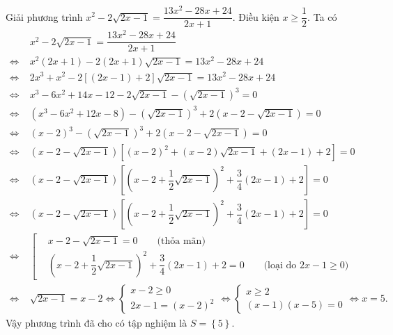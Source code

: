\begin{ex}%
Giải phương trình $x^2-2\sqrt{2x-1}=\dfrac{13x^2-28x+24}{2x+1}$.
\loigiai
    {
Điều kiện $x\ge \dfrac{1}{2}$. Ta có
{\allowdisplaybreaks \begin{align*}
&x^2-2\sqrt{2x-1}=\dfrac{13x^2-28x+24}{2x+1}\\ 
\Leftrightarrow\;&x^2(2x+1)-2(2x+1)\sqrt{2x-1}=13x^2-28x+24\\
\Leftrightarrow\;&2x^3+x^2-2\left[(2x-1)+2\right]\sqrt{2x-1}=13x^2-28x+24\\
\Leftrightarrow\;&x^3-6x^2+14x-12-2\sqrt{2x-1}-\left(\sqrt{2x-1}\right)^3=0\\
\Leftrightarrow\;&(x^3-6x^2+12x-8)-\left(\sqrt{2x-1}\right)^3+2\left(x-2-\sqrt{2x-1}\right)=0\\
\Leftrightarrow\;&(x-2)^3-\left(\sqrt{2x-1}\right)^3+2\left(x-2-\sqrt{2x-1}\right)=0\\
\Leftrightarrow\;&(x-2-\sqrt{2x-1})\left[(x-2)^2+(x-2)\sqrt{2x-1}+(2x-1)+2\right]=0\\
\Leftrightarrow\;&(x-2-\sqrt{2x-1})\left[\left(x-2+\dfrac{1}{2}\sqrt{2x-1}\right)^2+\dfrac{3}{4}(2x-1)+2\right]=0\\
\Leftrightarrow\;&(x-2-\sqrt{2x-1})\left[\left(x-2+\dfrac{1}{2}\sqrt{2x-1}\right)^2+\dfrac{3}{4}(2x-1)+2\right]=0\\
\Leftrightarrow\;&\left[\begin{aligned} &x-2-\sqrt{2x-1}=0\qquad\text{(thỏa mãn)}\\&\left(x-2+\dfrac{1}{2}\sqrt{2x-1}\right)^2+\dfrac{3}{4}(2x-1)+2=0\qquad \text{(loại do $2x-1\ge 0$)} \end{aligned}\right.\\
\Leftrightarrow\;&\sqrt{2x-1}=x-2
\Leftrightarrow\begin{cases}x-2\ge 0\\2x-1=(x-2)^2\end{cases}
\Leftrightarrow\begin{cases}x\ge 2\\(x-1)(x-5)=0\end{cases}\Leftrightarrow x=5.
\end{align*}}
Vậy phương trình đã cho có tập nghiệm là $S=\left\{5\right\}$.
    }
\end{ex}

